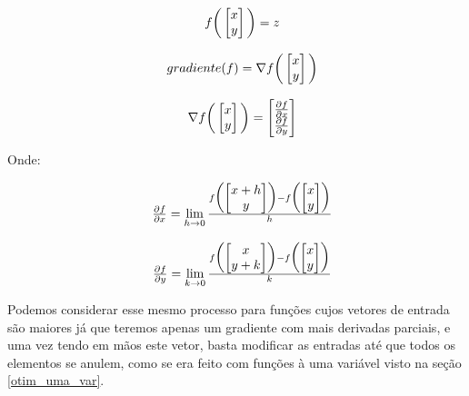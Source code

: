 \begin{equation}
    \begin{array}{ccc}
        &   f\bigg(\begin{bmatrix} x\\ y\\ \end{bmatrix}\bigg) = z\\
        &\\
        &   gradiente(f) = \nabla f\bigg(\begin{bmatrix} x\\ y\\ \end{bmatrix}\bigg)\\
        &\\
        &   \nabla f\bigg(\begin{bmatrix} x\\ y\\ \end{bmatrix}\bigg) = \begin{bmatrix} \frac{\partial f}{\partial x}\\ \frac{\partial f}{\partial y}\\ \end{bmatrix} \\
    \end{array}
\end{equation}

Onde:

\begin{equation}
    \begin{array}{ccc}
        &   \frac{\partial f}{\partial x} = \lim\limits_{h \to 0} \frac{f\bigg(\begin{bmatrix} x+h\\ y\\ \end{bmatrix}\bigg) - f\bigg(\begin{bmatrix} x\\ y\\ \end{bmatrix}\bigg)}{h}\\
        &\\
        &   \frac{\partial f}{\partial y} = \lim\limits_{k \to 0} \frac{f\bigg(\begin{bmatrix} x\\ y+k\\ \end{bmatrix}\bigg) - f\bigg(\begin{bmatrix} x\\ y\\ \end{bmatrix}\bigg)}{k}\\
    \end{array}
\end{equation}


Podemos considerar esse mesmo processo para funções cujos vetores de entrada são
maiores já que teremos apenas um gradiente com mais derivadas parciais, e uma
vez tendo em mãos este vetor, basta modificar as entradas até que todos os
elementos se anulem, como se era feito com funções à uma variável visto na
seção \ref{otim_uma_var}.




%
